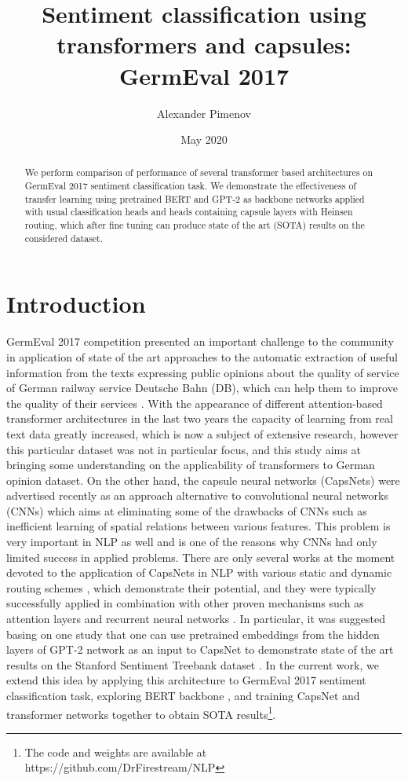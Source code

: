 \documentclass{article}
\title{Sentiment classification using transformers and capsules: GermEval 2017}
\author{Alexander Pimenov}
\date{May 2020}
\begin{document}
\maketitle
\begin{abstract}
    We perform comparison of performance of several transformer based architectures on GermEval 2017 sentiment classification task. We demonstrate the effectiveness of transfer learning using pretrained BERT and GPT-2 as backbone networks applied with usual classification heads and heads containing capsule layers with Heinsen routing, which after fine tuning can produce state of the art (SOTA) results on the considered dataset.
\end{abstract}



\section{Introduction}

GermEval 2017 competition presented an important challenge to the community in application of state of the art approaches to the automatic extraction of useful information from the texts expressing public opinions about the quality of service of German railway service Deutsche Bahn (DB), which can help them to improve the quality of their services \cite{germevaltask2017}. With the appearance of different attention-based transformer architectures in the last two years the capacity of learning from real text data greatly increased, which is now a subject of extensive research, however this particular dataset was not in particular focus, and this study aims at bringing some understanding on the applicability of transformers to German opinion dataset.  On the other hand, the capsule neural networks (CapsNets) were advertised recently as an approach alternative to convolutional neural networks (CNNs) which aims at eliminating some of the drawbacks of CNNs such as inefficient learning of spatial relations between various features. This problem is very important in NLP as well and is one of the reasons why CNNs had only limited success in applied problems. There are only several works at the moment devoted to the application of CapsNets in NLP with various static and dynamic routing schemes \cite{kim2020text}, which demonstrate their potential, and they were typically successfully applied in combination with other proven mechanisms such as attention layers \cite{xiao2018mcapsnet} and recurrent neural networks \cite{wang2018attention}. In particular, it was suggested basing on one study that one can use pretrained embeddings from the hidden layers of GPT-2 network \cite{radford2019language} as an input to CapsNet to demonstrate state of the art results on the Stanford Sentiment Treebank dataset \cite{heinsen2019algorithm}. In the current work, we extend this idea by applying this architecture to GermEval 2017 sentiment classification task, exploring BERT backbone \cite{devlin2018bert}, and training CapsNet and transformer networks together to obtain SOTA results\footnote{The code and weights are available at https://github.com/DrFirestream/NLP}. 
\end{document}
